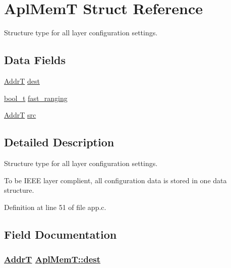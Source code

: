 \hypertarget{structAplMemT}{
\section{Apl\-Mem\-T Struct Reference}
\label{structAplMemT}
}
Structure type for all layer configuration settings.  


\subsection*{Data Fields}
\begin{CompactItemize}
\item 
\hyperlink{ntrxtypes_8h_9763ea343e88d0129a49347a4b2ff676}{Addr\-T} \hyperlink{structAplMemT_cf803b1247af61b84c981238caf1b13f}{dest}
\item 
\hyperlink{ntrxtypes_8h_04dd5074964518403bf944f2b240a5f8}{bool\_\-t} \hyperlink{structAplMemT_5d70a5712537b9865b5f0820e4f856b8}{fast\_\-ranging}
\item 
\hyperlink{ntrxtypes_8h_9763ea343e88d0129a49347a4b2ff676}{Addr\-T} \hyperlink{structAplMemT_df06b4a705d3ec9ebaf7a9cb2d3c3fff}{src}
\end{CompactItemize}


\subsection{Detailed Description}
Structure type for all layer configuration settings. 

To be IEEE layer complient, all configuration data is stored in one data structure. 



Definition at line 51 of file app.c.

\subsection{Field Documentation}
\hypertarget{structAplMemT_cf803b1247af61b84c981238caf1b13f}{
\subsubsection[dest]{\setlength{\rightskip}{0pt plus 5cm}\hyperlink{ntrxtypes_8h_9763ea343e88d0129a49347a4b2ff676}{Addr\-T} \hyperlink{structAplMemT_cf803b1247af61b84c981238caf1b13f}{Apl\-Mem\-T::dest}}}
\label{structAplMemT_cf803b1247af61b84c981238caf1b13f}


